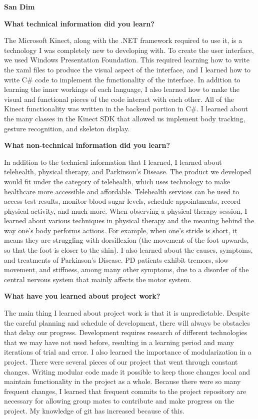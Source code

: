 \documentclass[onecolumn, draftclsnofoot,10pt, compsoc]{IEEEtran}
\begin{document}
\begin{flushleft}
{\large\textbf{San Dim}\par}
\textbf{What technical information did you learn?}\par
The Microsoft Kinect, along with the .NET framework required to use it, is a technology I was completely new to developing with. To create the user interface, we used Windows Presentation Foundation. This required learning how to write the xaml files to produce the visual aspect of the interface, and I learned how to write C\# code to implement the functionality of the interface. In addition to learning the inner workings of each language, I also learned how to make the visual and functional pieces of the code interact with each other. All of the Kinect functionality was written in the backend portion in C\#. I learned about the many classes in the Kinect SDK that allowed us implement body tracking, gesture recognition, and skeleton display.

\textbf{What non-technical information did you learn?}\par
In addition to the technical information that I learned, I learned about telehealth, physical therapy, and Parkinson's Disease. The product we developed would fit under the category of telehealth, which uses technology to make healthcare more accessible and affordable. Telehealth services can be used to access test results, monitor blood sugar levels, schedule appointments, record physical activity, and much more. When observing a physical therapy session, I learned about various techniques in physical therapy and the meaning behind the way one's body performs actions. For example, when one's stride is short, it means they are struggling with dorsiflexion (the movement of the foot upwards, so that the foot is closer to the shin). I also learned about the causes, symptoms, and treatments of Parkinson's Disease. PD patients exhibit tremors, slow movement, and stiffness, among many other symptoms, due to a disorder of the central nervous system that mainly affects the motor system. 

\textbf{What have you learned about project work?}\par
The main thing I learned about project work is that it is unpredictable. Despite the careful planning and schedule of development, there will always be obstacles that delay our progress. Development requires research of different technologies that we may have not used before, resulting in a learning period and many iterations of trial and error. I also learned the importance of modularization in a project. There were several pieces of our project that went through constant changes. Writing modular code made it possible to keep those changes local and maintain functionality in the project as a whole. Because there were so many frequent changes, I learned that frequent commits to the project repository are necessary for allowing group mates to contribute and make progress on the project. My knowledge of git has increased because of this.


\end{flushleft}
\end{document}
